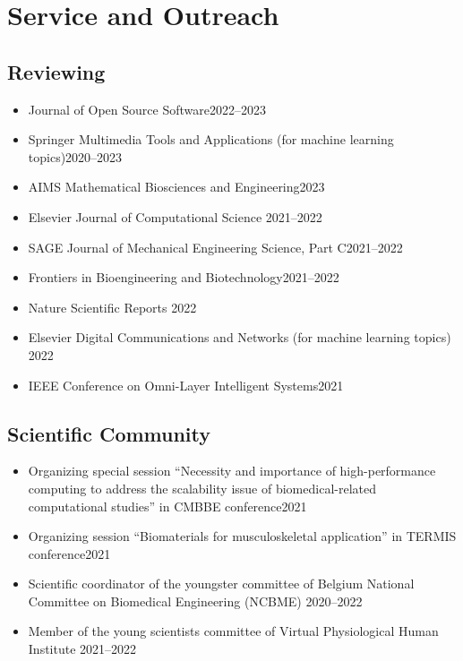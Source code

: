 \documentclass{cv}
\begin{document}

\section{Service and Outreach}

\subsection{Reviewing}

\begin{itemize}[itemsep=-0.2ex]
\item
Journal of Open Source Software\hfill 2022--2023
\item
Springer Multimedia Tools and Applications (for machine learning topics)\hfill 2020--2023
\item
AIMS Mathematical Biosciences and Engineering\hfill 2023
\item
Elsevier Journal of Computational Science \hfill 2021--2022
\item
SAGE Journal of Mechanical Engineering Science, Part C\hfill 2021--2022
\item
Frontiers in Bioengineering and Biotechnology\hfill 2021--2022
\item
Nature Scientific Reports \hfill 2022
\item
Elsevier Digital Communications and Networks (for machine learning topics) \hfill 2022
\item
IEEE Conference on Omni-Layer Intelligent Systems\hfill 2021
\end{itemize}

\subsection{Scientific Community}

\begin{itemize}[itemsep=-0.2ex]
\item
Organizing special session ``Necessity and importance of high-performance computing to address the scalability issue of biomedical-related computational studies'' in CMBBE conference\hfill 2021
\item
Organizing session ``Biomaterials for musculoskeletal application'' in TERMIS conference\hfill 2021
\item
Scientific coordinator of the youngster committee of Belgium National Committee on Biomedical Engineering (NCBME) \hfill 2020--2022
\item
Member of the young scientists committee of Virtual Physiological Human Institute \hfill 2021--2022
\end{itemize}
\end{document}
